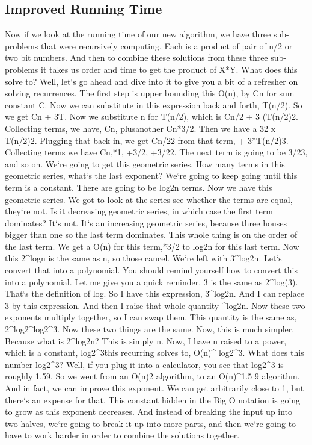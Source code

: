 \subsection{Improved  Running Time}
Now if we look at the running time of our new algorithm, we have three sub-problems that were recursively computing.
Each is a product of pair of n/2 or two bit numbers.
And then to combine these solutions from these three sub-problems it takes us order and time to get the product of X*Y\@.
What does this solve to? Well, let`s go ahead and dive into it to give you a bit of a refresher on solving recurrences.
The first step is upper bounding this O(n), by Cn for sum constant C\@.
Now we can substitute in this expression back and forth, T(n/2).
So we get Cn + 3T\@.
Now we substitute n for T(n/2), which is Cn/2 + 3 (T(n/2)2.
Collecting terms, we have, Cn, plusanother Cn*3/2.
Then we have a 32 x T(n/2)2.
Plugging that back in, we get Cn/22 from that term, + 3*T(n/2)3.
Collecting terms we have Cn,*1, +3/2, +3/22.
The next term is going to be 3/23, and so on.
We`re going to get this geometric series.
How many terms in this geometric series, what`s the last exponent? We`re going to keep going until this term is a constant.
There are going to be log2n terms.
Now we have this geometric series.
We got to look at the series see whether the terms are equal, they`re not.
Is it decreasing geometric series, in which case the first term dominates? It`s not.
It`s an increasing geometric series, because three houses bigger than one so the last term dominates.
This whole thing is on the order of the last term.
We get a O(n) for this term,*3/2 to log2n for this last term.
Now this 2\textasciicircum{}logn is the same as n, so those cancel.
We`re left with 3\textasciicircum{}log2n.
Let`s convert that into a polynomial.
You should remind yourself how to convert this into a polynomial.
Let me give you a quick reminder. 3 is the same as 2\textasciicircum{}log(3).
That`s the definition of log.
So I have this expression, 3\textasciicircum{}log2n.
And I can replace 3 by this expression.
And then I raise that whole quantity \textasciicircum{}log2n.
Now these two exponents multiply together, so I can swap them.
This quantity is the same as, 2\textasciicircum{}log2\textasciicircum{}log2\textasciicircum{}3.
Now these two things are the same.
Now, this is much simpler.
Because what is 2\textasciicircum{}log2n? This is simply n.
Now, I have n raised to a power, which is a constant, log2\textasciicircum{}3\. this recurring solves to, O(n)\textasciicircum{} log2\textasciicircum{}3.
What does this number log2\textasciicircum{}3? Well, if you plug it into a calculator, you see that log2\textasciicircum{}3 is roughly 1.59.
So we went from an O(n)2 algorithm, to an O(n)\textasciicircum{}1.5 9 algorithm.
And in fact, we can improve this exponent.
We can get arbitrarily close to 1, but there`s an expense for that.
This constant hidden in the Big O notation is going to grow as this exponent decreases.
And instead of breaking the input up into two halves, we`re going to break it up into more parts, and then we`re going to have to work harder in order to combine the solutions together.

